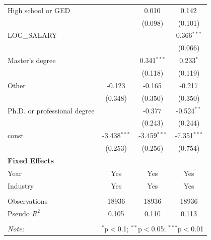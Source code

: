 \begin{table}[!htbp]
\begin{tabular}{@{\extracolsep{5pt}}lccc}
 High school or GED & & 0.010$^{}$ & 0.142$^{}$ \\
& & (0.098) & (0.101) \\
 LOG_SALARY & & & 0.366$^{***}$ \\
& & & (0.066) \\
 Master's degree & & 0.341$^{***}$ & 0.233$^{*}$ \\
& & (0.118) & (0.119) \\
 Other & -0.123$^{}$ & -0.165$^{}$ & -0.217$^{}$ \\
& (0.348) & (0.350) & (0.350) \\
 Ph.D. or professional degree & & -0.377$^{}$ & -0.524$^{**}$ \\
& & (0.243) & (0.244) \\
 const & -3.438$^{***}$ & -3.459$^{***}$ & -7.351$^{***}$ \\
& (0.253) & (0.256) & (0.754) \\
 \textbf{Fixed Effects} &  &  &  \\
 Year & Yes & Yes & Yes \\
 Industry & Yes & Yes & Yes \\
\hline \\[-1.8ex]
 Observations & 18936 & 18936 & 18936 \\
 Pseudo $R^2$ & 0.105 & 0.110 & 0.113 \\
\hline
\hline \\[-1.8ex]
\textit{Note:} & \multicolumn{3}{r}{$^{*}$p$<$0.1; $^{**}$p$<$0.05; $^{***}$p$<$0.01} \\
\end{tabular}
\end{table}